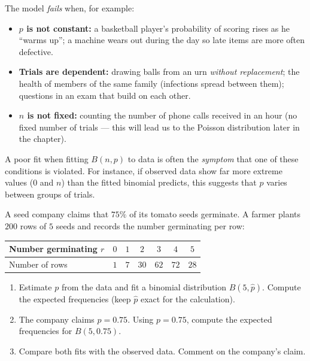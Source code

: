\documentclass[11pt]{article}
\begin{document}
The model \emph{fails} when, for example:
\begin{itemize}
\item \textbf{$p$ is not constant:} a basketball player's probability of scoring rises as he ``warms up''; a machine wears out during the day so late items are more often defective.
\item \textbf{Trials are dependent:} drawing balls from an urn \emph{without replacement}; the health of members of the same family (infections spread between them); questions in an exam that build on each other.
\item \textbf{$n$ is not fixed:} counting the number of phone calls received in an hour (no fixed number of trials --- this will lead us to the Poisson distribution later in the chapter).
\end{itemize}

A poor fit when fitting $B(n,p)$ to data is often the \emph{symptom} that one of these conditions is violated. For instance, if observed data show far more extreme values ($0$ and $n$) than the fitted binomial predicts, this suggests that $p$ varies between groups of trials.

\begin{exercice}
A seed company claims that $75\%$ of its tomato seeds germinate. A farmer plants $200$ rows of $5$ seeds and records the number germinating per row:
\begin{center}
\begin{tabular}{|l|c|c|c|c|c|c|}
\hline
\rowcolor{popblueL} Number germinating $r$ & $0$ & $1$ & $2$ & $3$ & $4$ & $5$ \\
\hline Number of rows & $1$ & $7$ & $30$ & $62$ & $72$ & $28$ \\
\hline
\end{tabular}
\end{center}
\begin{enumerate}
\item Estimate $p$ from the data and fit a binomial distribution $B(5,\hat{p})$. Compute the expected frequencies (keep $\hat{p}$ exact for the calculation).
\item The company claims $p=0.75$. Using $p=0.75$, compute the expected frequencies for $B(5,0.75)$.
\item Compare both fits with the observed data. Comment on the company's claim.
\end{enumerate}
\end{exercice}
\end{document}
